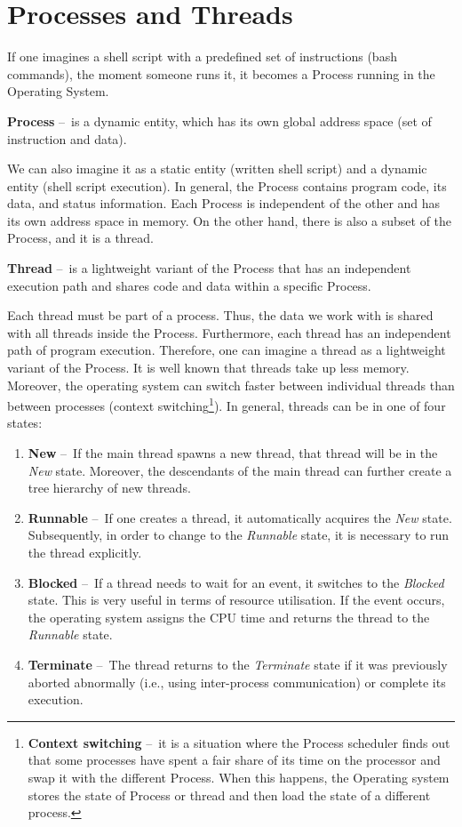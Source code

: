 \section{Processes and Threads}
\label{04:processesandthreads}

If one imagines a shell script with a predefined set of instructions (bash commands), the moment someone runs it, it becomes a Process running in the Operating System.
\begin{definition}
    \textbf{Process} \---\ is a dynamic entity, which has its own global address space (set of instruction and data).
\end{definition}
We can also imagine it as a static entity (written shell script) and a dynamic entity (shell script execution). In general, the Process contains program code, its data, and status information. Each Process is independent of the other and has its own address space in memory. On the other hand, there is also a subset of the Process, and it is a thread.
\begin{definition}
    \textbf{Thread} \---\ is a lightweight variant of the Process that has an independent execution path and shares code and data within a specific Process.
\end{definition}
Each thread must be part of a process. Thus, the data we work with is shared with all threads inside the Process. Furthermore, each thread has an independent path of program execution. Therefore, one can imagine a thread as a lightweight variant of the Process. It is well known that threads take up less memory. Moreover, the operating system can switch faster between individual threads than between processes (context switching\footnote {\textbf{Context switching} \---\ it is a situation where the Process scheduler finds out that some processes have spent a fair share of its time on the processor and swap it with the different Process. When this happens, the Operating system stores the state of Process or thread and then load the state of a different process.}). In general, threads can be in one of four states:
\begin{enumerate}[itemsep=1mm, parsep=0pt]
    \item \textbf{New} \---\ If the main thread spawns a new thread, that thread will be in the \emph{New} state. Moreover, the descendants of the main thread can further create a tree hierarchy of new threads.
    \item \textbf{Runnable} \---\ If one creates a thread, it automatically acquires the \emph{New} state. Subsequently, in order to change to the \emph{Runnable} state, it is necessary to run the thread explicitly.
    \item \textbf {Blocked} \---\ If a thread needs to wait for an event, it switches to the \emph{Blocked} state. This is very useful in terms of resource utilisation. If the event occurs, the operating system assigns the CPU time and returns the thread to the \emph{Runnable} state.
    \item \textbf{Terminate} \---\ The thread returns to the \emph {Terminate} state if it was previously aborted abnormally (i.e., using inter-process communication) or complete its execution.
\end{enumerate}

